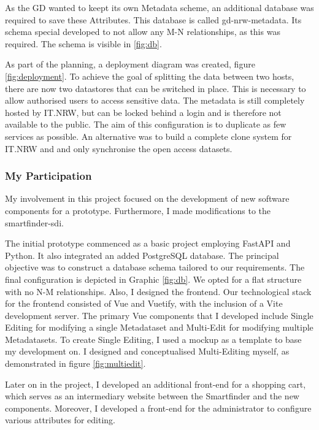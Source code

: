 \documentclass[11pt, titlepage, a4paper]{article}
\begin{document}
As the GD wanted to keept its own Metadata scheme, an additional database was required to save these Attributes.  This database  is called gd-nrw-metadata. Its schema special developed to not allow any M-N relationships, as this was required.  The schema is visible in \ref{fig:db}.



As part of the planning, a deployment diagram was created, figure \ref{fig:deployment}. To achieve the goal of splitting the data between two hosts, there are now two datastores that can be switched in place. This is necessary to allow authorised users to access sensitive data. The metadata is still completely hosted by IT.NRW, but can be locked behind a login and is therefore not available to the public. The aim of this configuration is to duplicate as few services as possible.
An alternative was to build a complete clone system for IT.NRW and  and only synchronise the open access datasets.

\subsubsection{My Participation}
My involvement in this project focused on the development of new software components for a prototype. Furthermore, I made modifications to the smartfinder-sdi.



The initial prototype commenced as a basic project employing FastAPI and Python. It also integrated an added PostgreSQL database. The principal objective was to construct a database schema tailored to our requirements. The final configuration is depicted in Graphic \ref{fig:db}. We opted for a flat structure with no N-M relationships.
Also, I designed the frontend. Our technological stack for the frontend consisted of Vue and Vuetify, with the inclusion of a Vite development server. The primary Vue components that I developed include Single Editing for modifying a single Metadataset and Multi-Edit for modifying multiple Metadatasets. To create Single Editing, I used a mockup as a template to base my development on. I designed and conceptualised Multi-Editing myself, as demonstrated in figure \ref{fig:multiedit}.

Later on in the project, I developed an additional front-end for a shopping cart, which serves as an intermediary website between the Smartfinder and the new components. Moreover, I developed a front-end for the administrator to configure various attributes for editing.
\end{document}
